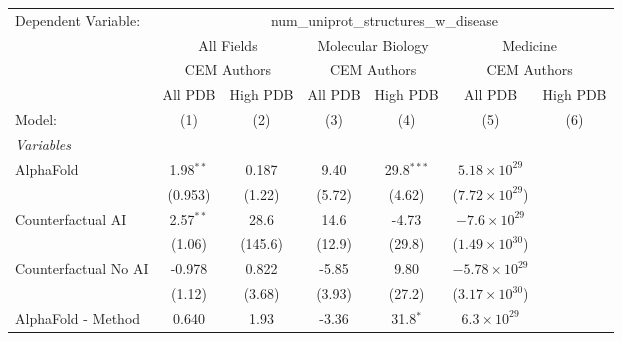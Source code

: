 \begingroup
\centering
\begin{tabular}{lcccccc}
   \tabularnewline \midrule \midrule
   Dependent Variable: & \multicolumn{6}{c}{num\_uniprot\_structures\_w\_disease}\\
 & \multicolumn{2}{c}{All Fields} & \multicolumn{2}{c}{Molecular Biology} & \multicolumn{2}{c}{Medicine} \\
\cmidrule(lr){2-3} \cmidrule(lr){4-5} \cmidrule(lr){6-7}
 & \multicolumn{2}{c}{CEM Authors} & \multicolumn{2}{c}{CEM Authors} & \multicolumn{2}{c}{CEM Authors} \\
\cmidrule(lr){2-3} \cmidrule(lr){4-5} \cmidrule(lr){6-7}
 & \multicolumn{1}{c}{All PDB} & \multicolumn{1}{c}{High PDB} & \multicolumn{1}{c}{All PDB} & \multicolumn{1}{c}{High PDB} & \multicolumn{1}{c}{All PDB} & \multicolumn{1}{c}{High PDB} \\
\cmidrule(lr){2-2} \cmidrule(lr){3-3} \cmidrule(lr){4-4} \cmidrule(lr){5-5} \cmidrule(lr){6-6} \cmidrule(lr){7-7}
   Model:                                                     & (1)         & (2)     & (3)          & (4)          & (5)                     & (6)\\  
   \midrule
   \emph{Variables}\\
   AlphaFold                                                  & 1.98$^{**}$ & 0.187   & 9.40         & 29.8$^{***}$ & $5.18\times 10^{29}$    &   \\   
                                                              & (0.953)     & (1.22)  & (5.72)       & (4.62)       & ($7.72\times 10^{29}$)  &   \\   
   Counterfactual AI                                          & 2.57$^{**}$ & 28.6    & 14.6         & -4.73        & $-7.6\times 10^{29}$    &   \\   
                                                              & (1.06)      & (145.6) & (12.9)       & (29.8)       & ($1.49\times 10^{30}$)  &   \\   
   Counterfactual No AI                                       & -0.978      & 0.822   & -5.85        & 9.80         & $-5.78\times 10^{29}$   &   \\   
                                                              & (1.12)      & (3.68)  & (3.93)       & (27.2)       & ($3.17\times 10^{30}$)  &   \\   
   AlphaFold - Method                                         & 0.640       & 1.93    & -3.36        & 31.8$^{*}$   & $6.3\times 10^{29}$     &   \\   

\end{tabular}
